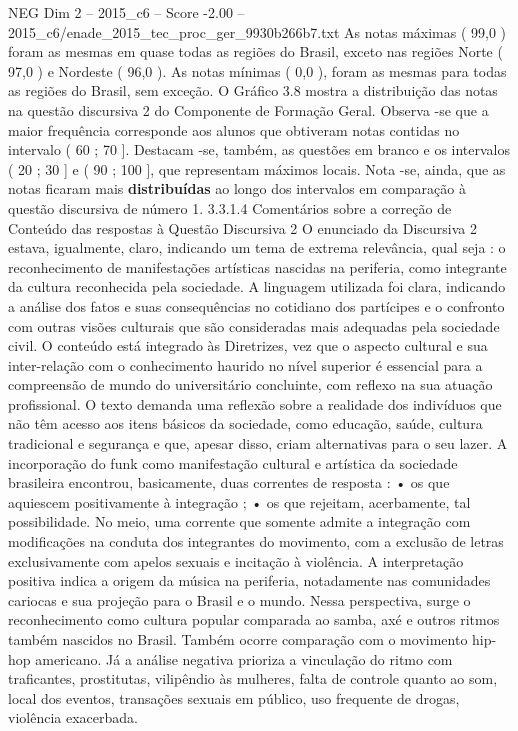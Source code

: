 \begin{textsample}{NEG Dim 2 – 2015\_c6 – Score -2.00 – 2015\_c6/enade\_2015\_tec\_proc\_ger\_9930b266b7.txt}
As notas máximas ( 99,0 ) foram as mesmas em quase todas as regiões do Brasil, exceto nas regiões Norte ( 97,0 ) e Nordeste ( 96,0 ).
As notas mínimas ( 0,0 ), foram as mesmas para todas as regiões do Brasil, sem exceção.
O Gráfico 3.8 mostra a distribuição das notas na questão discursiva 2 do Componente de Formação Geral.
Observa -se que a maior frequência corresponde aos alunos que obtiveram notas contidas no intervalo ( 60 ; 70 ].
Destacam -se, também, as questões em branco e os intervalos ( 20 ; 30 ] e ( 90 ; 100 ], que representam máximos locais.
Nota -se, ainda, que as notas ficaram mais \textbf{distribuídas} ao longo dos intervalos em comparação à questão discursiva de número 1. 3.3.1.4 Comentários sobre a correção de Conteúdo das respostas à Questão Discursiva 2 O enunciado da Discursiva 2 estava, igualmente, claro, indicando um tema de extrema relevância, qual seja : o reconhecimento de manifestações artísticas nascidas na periferia, como integrante da cultura reconhecida pela sociedade.
A linguagem utilizada foi clara, indicando a análise dos fatos e suas consequências no cotidiano dos partícipes e o confronto com outras visões culturais que são consideradas mais adequadas pela sociedade civil.
O conteúdo está integrado às Diretrizes, vez que o aspecto cultural e sua inter-relação com o conhecimento haurido no nível superior é essencial para a compreensão de mundo do universitário concluinte, com reflexo na sua atuação profissional.
O texto demanda uma reflexão sobre a realidade dos indivíduos que não têm acesso aos itens básicos da sociedade, como educação, saúde, cultura tradicional e segurança e que, apesar disso, criam alternativas para o seu lazer.
A incorporação do funk como manifestação cultural e artística da sociedade brasileira encontrou, basicamente, duas correntes de resposta : • os que aquiescem positivamente à integração ; • os que rejeitam, acerbamente, tal possibilidade.
No meio, uma corrente que somente admite a integração com modificações na conduta dos integrantes do movimento, com a exclusão de letras exclusivamente com apelos sexuais e incitação à violência.
A interpretação positiva indica a origem da música na periferia, notadamente nas comunidades cariocas e sua projeção para o Brasil e o mundo.
Nessa perspectiva, surge o reconhecimento como cultura popular comparada ao samba, axé e outros ritmos também nascidos no Brasil.
Também ocorre comparação com o movimento hip-hop americano.
Já a análise negativa prioriza a vinculação do ritmo com traficantes, prostitutas, vilipêndio às mulheres, falta de controle quanto ao som, local dos eventos, transações sexuais em público, uso frequente de drogas, violência exacerbada.

\end{textsample}
